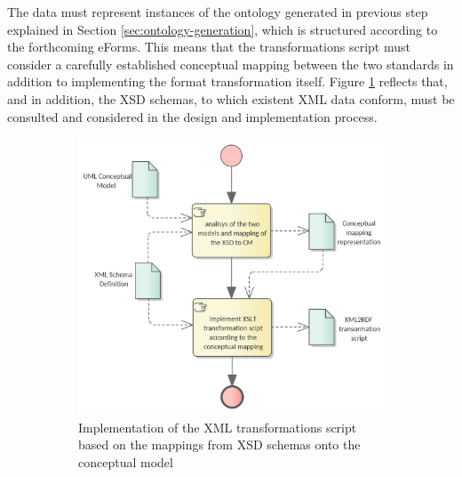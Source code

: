 	The data must represent instances of the ontology generated in previous step explained in Section \ref{sec:ontology-generation}, which is structured according to the forthcoming eForms. This means that the transformations script must consider a carefully established conceptual mapping between the two standards in addition to implementing the format transformation itself. Figure \ref{fig:sub1} reflects that, and in addition, the XSD schemas, to which existent XML data conform, must be consulted and considered in the design and implementation process.

	\begin{figure}[!ht]
		\centering
		\begin{subfigure}[b]{.48\textwidth}
			\centering
			\includegraphics[width=1.05\linewidth]{../img/xml2rdfScriptCreation.png}
			\caption{Implementation of the XML transformations script based on the mappings from XSD schemas onto the conceptual model}
			\label{fig:sub1}
		\end{subfigure}%
		\quad
		\begin{subfigure}[b]{.48\textwidth}
			\centering

\end{subfigure}
\end{figure}
